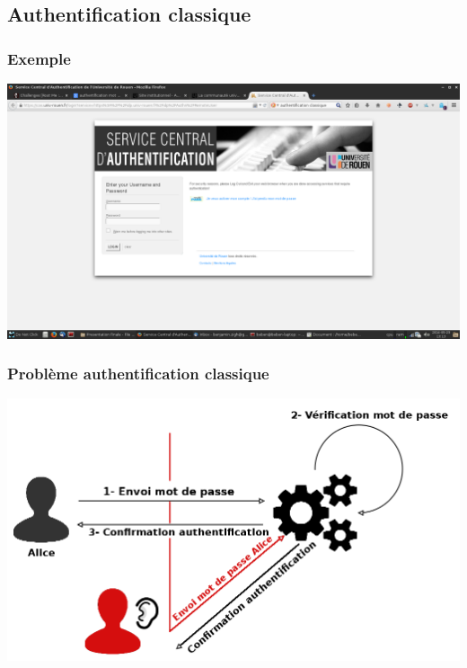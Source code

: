\documentclass[xcolor=table]{beamer}
\begin{document}
\subsection{Authentification classique}
\begin{frame}
\frametitle{Exemple}
\includegraphics[scale=0.21]{../graphics/auth-mdp.png}
\end{frame}

\begin{frame}
\frametitle{Problème authentification classique}
\includegraphics[scale=0.24]{../graphics/authsimple1.png}
\end{frame}
\end{document}

